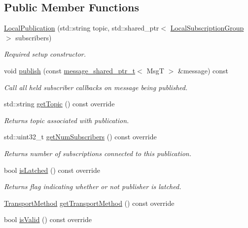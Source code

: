 \subsection*{Public Member Functions}
\begin{DoxyCompactItemize}
\item 
\hyperlink{classflow__ros_1_1routing_1_1_local_publication_a1430b9009fbb39639d69faa0545b8ec8}{Local\+Publication} (std\+::string topic, std\+::shared\+\_\+ptr$<$ \hyperlink{classflow__ros_1_1routing_1_1_local_subscription_group}{Local\+Subscription\+Group} $>$ subscribers)
\begin{DoxyCompactList}\small\item\em Required setup constructor. \end{DoxyCompactList}\item 
void \hyperlink{classflow__ros_1_1routing_1_1_local_publication_ab2d53a2bd93e83ee11095f35d5820226}{publish} (const \hyperlink{namespaceflow__ros_a21a684f38ee2083b3858613317c46d82}{message\+\_\+shared\+\_\+ptr\+\_\+t}$<$ MsgT $>$ \&message) const
\begin{DoxyCompactList}\small\item\em Call all held subscriber callbacks on message being published. \end{DoxyCompactList}\item 
std\+::string \hyperlink{classflow__ros_1_1routing_1_1_local_publication_ab4d9ccc2b388dfe3db3ca1f4c1b0651d}{get\+Topic} () const override
\begin{DoxyCompactList}\small\item\em Returns topic associated with publication. \end{DoxyCompactList}\item 
std\+::uint32\+\_\+t \hyperlink{classflow__ros_1_1routing_1_1_local_publication_a3c79d6a426202a0ba0fad4f3de9e07b4}{get\+Num\+Subscribers} () const override
\begin{DoxyCompactList}\small\item\em Returns number of subscriptions connected to this publication. \end{DoxyCompactList}\item 
bool \hyperlink{classflow__ros_1_1routing_1_1_local_publication_ad1b48ed20ccdab599389f3132f545dd8}{is\+Latched} () const override
\begin{DoxyCompactList}\small\item\em Returns flag indicating whether or not publisher is latched. \end{DoxyCompactList}\item 
\hyperlink{transport__info_8h_ae57afcf849a5bdb82b958347c6ccc57b}{Transport\+Method} \hyperlink{classflow__ros_1_1routing_1_1_local_publication_a386554f0af2d80bdf566c496ea01b4b8}{get\+Transport\+Method} () const override
\item 
bool \hyperlink{classflow__ros_1_1routing_1_1_local_publication_a982359da6513c94f5befd4e990796c28}{is\+Valid} () const override
\end{DoxyCompactItemize}
